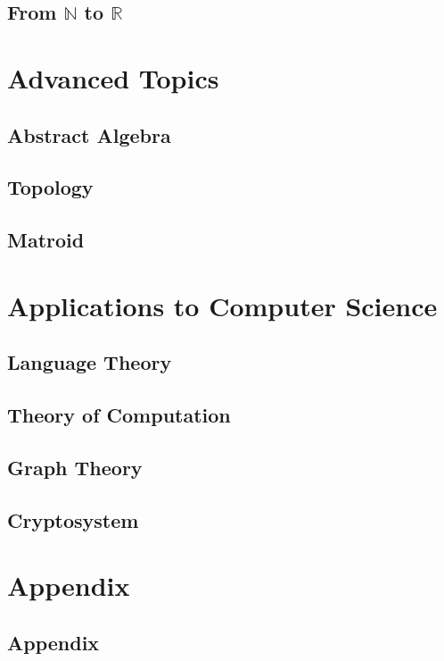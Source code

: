 \documentclass{report}
\theoremstyle{break}
\begin{document}
		\chapter{From $\mathbb{N}$ to $\mathbb{R}$}
		    
	
	\part{Advanced Topics}
	    
	    \chapter{Abstract Algebra}
	        
	    
	    \chapter{Topology}
	        
	        
	    \chapter{Matroid}
	        

	\part{Applications to Computer Science}
	
		\chapter{Language Theory}
		    
		
		\chapter{Theory of Computation}
		    
		
		\chapter{Graph Theory}
		    
		
		\chapter{Cryptosystem}
		    
	
	\part{Appendix}
		\chapter{Appendix}
		    
\end{document}
